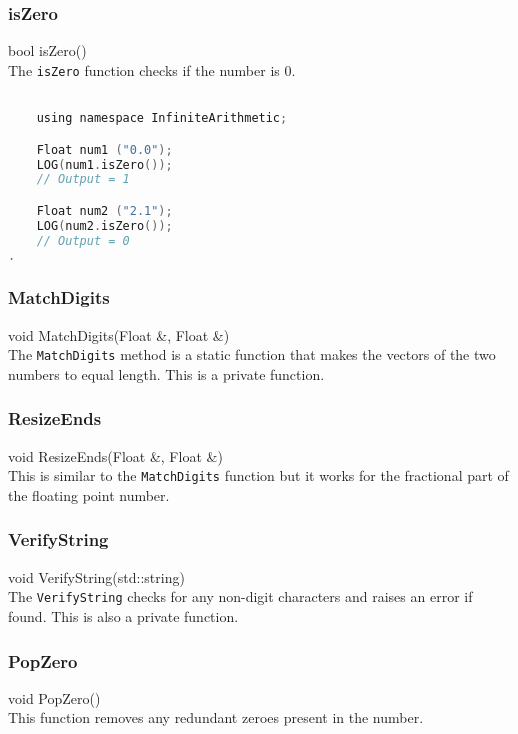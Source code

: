 \subsubsection{isZero}
{\ttfamily \large bool isZero()} \\[2mm]
The \verb|isZero| function checks if the number is $0$.
\vspace*{1em}
\begin{lstlisting}[language = C]

	using namespace InfiniteArithmetic;

	Float num1 ("0.0");
	LOG(num1.isZero());
	// Output = 1

	Float num2 ("2.1");
	LOG(num2.isZero());
	// Output = 0
.
\end{lstlisting}
\vspace*{1em}


\subsubsection{MatchDigits}
{\ttfamily \large void MatchDigits(Float \&, Float \&)} \\[2mm]
The \verb|MatchDigits| method is a static function that makes the vectors of the two numbers to equal length. This is a private function.

\subsubsection{ResizeEnds}
{\ttfamily \large void ResizeEnds(Float \&, Float \&)} \\[2mm]
This is similar to the \verb|MatchDigits| function but it works for the fractional part of the floating point number.

\subsubsection{VerifyString}
{\ttfamily \large void VerifyString(std::string)} \\[2mm]
The \verb|VerifyString| checks for any non-digit characters and raises an error if found. This is also a private function.

\subsubsection{PopZero}
{\ttfamily \large void PopZero()} \\[2mm]
This function removes any redundant zeroes present in the number.


